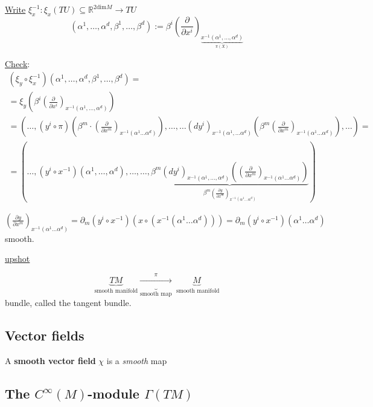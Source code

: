\begin{enumerate}
\underline{Write} $\xi_x^{-1} : \xi_x(TU) \subseteq \mathbb{R}^{2\text{dim}M} \to TU$
\[
(\alpha^1 , \dots , \alpha^d, \beta^1, \dots , \beta^d) := \beta^i \left( \frac{ \partial }{ \partial x^i} \right)_{ \underbrace{ x^{-1}(\alpha^1 , \dots , \alpha^d) }_{\pi(X)} }
\]

\underline{Check}: \[
\begin{gathered}
  (\xi_y \circ \xi_x^{-1})(\alpha^1 , \dots , \alpha^d, \beta^1, \dots , \beta^d) = \\
  = \xi_y \left( \beta^i \left( \frac{ \partial }{ \partial x^i} \right)_{x^{-1}(\alpha^1 , \dots , \alpha^d) } \right) \\
  = \left( \dots, (y^i \circ \pi)( \beta^m \cdot \left( \frac{ \partial }{ \partial x^m} \right)_{x^{-1}(\alpha^1 \dots \alpha^d) } )  , \dots , \dots (dy^i)_{x^{-1}(\alpha^1, \dots \alpha^d) } \left( \beta^m \left( \frac{ \partial }{ \partial x^m} \right)_{x^{-1}(\alpha^1 \dots \alpha^d) } \right) , \dots   \right) = \\
  = ( \dots , (y^i \circ x^{-1})(\alpha^1 , \dots , \alpha^d), \dots , \dots , \underbrace{ \beta^m(dy^i)_{x^{-1} (\alpha^1, \dots , \alpha^d) } \left( \left( \frac{ \partial }{ \partial x^m} \right)_{x^{-1}(\alpha^1 \dots \alpha^d) } \right)}_{ \beta^m \left( \frac{ \partial y }{ \partial x^m } \right)_{x^{-1}(\alpha^1 \dots \alpha^d)} }  ) 
\end{gathered}
\]

%
$\left( \frac{ \partial y }{ \partial x^m } \right)_{x^{-1}(\alpha^1 \dots \alpha^d)} = \partial_m (y^i \circ x^{-1} )( x\circ (x^{-1}(\alpha^1 \dots \alpha^d) ) ) = \partial_m (y^i \circ x^{-1} )( \alpha^1 \dots \alpha^d)$ smooth.  

\underline{upshot}

\[
\underbrace{TM}_{\text{smooth manifold}} \underbrace{ \xrightarrow{\pi} }_{\text{smooth map} } \underbrace{M}_{\text{ smooth manifold} }
\]
bundle, called the tangent bundle.

\end{enumerate}

\subsection{Vector fields}

\begin{definition}
  A \textbf{smooth vector field} $\chi$ is a \emph{smooth} map
\end{definition}

\subsection{The $C^{\infty}(M)$-module $\Gamma(TM)$}

